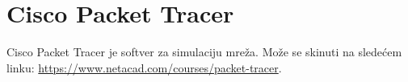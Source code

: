\section{Cisco Packet Tracer}
Cisco Packet Tracer je softver za simulaciju mreža. Može se skinuti na sledećem linku: \href{https://www.netacad.com/courses/packet-tracer}{https://www.netacad.com/courses/packet-tracer}.
